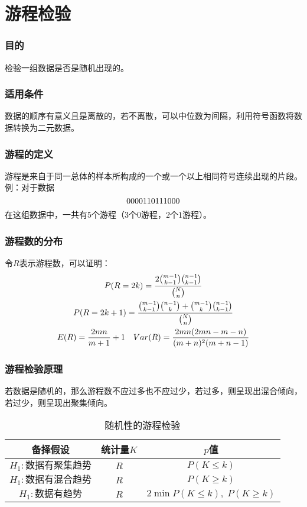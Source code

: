 \section{游程检验}

\subsubsection{目的}
检验一组数据是否是随机出现的。
\subsubsection{适用条件}
数据的顺序有意义且是离散的，若不离散，可以中位数为间隔，利用符号函数将数据转换为二元数据。
\subsubsection{游程的定义}
游程是来自于同一总体的样本所构成的一个或一个以上相同符号连续出现的片段。例：对于数据
\begin{equation}
	0 0 0 0 1 1 0 1 1 1 0 0 0 \notag
\end{equation}
\hspace{2em}在这组数据中，一共有$5$个游程（$3$个$0$游程，$2$个$1$游程）。
\subsubsection{游程数的分布}
令$R$表示游程数，可以证明：
\begin{gather}
	P(R=2k)=\frac{2\binom{m-1}{k-1}\binom{n-1}{k-1}}{\binom{N}{n}}\notag\\
	P(R=2k+1)=\frac{\binom{m-1}{k-1}\binom{n-1}{k}+\binom{m-1}{k}\binom{n-1}{k-1}}{\binom{N}{n}}\notag\\
	E(R) = \frac{2mn}{m+1}+1\quad Var(R)=\dfrac{2mn(2mn-m-n)}{(m+n)^2(m+n-1)}\notag
\end{gather}
\subsubsection{游程检验原理}
若数据是随机的，那么游程数不应过多也不应过少，若过多，则呈现出混合倾向，若过少，则呈现出聚集倾向。

\begin{table}[htbp]
	\centering
	\begin{tabular}{ccc}
		\toprule
		备择假设 & 统计量$K$ & $p$值 \\
		\midrule 
		$H_1:\text{数据有聚集趋势}$ & $R$ & $P(K\leqslant k)$ \\
		$H_1:\text{数据有混合趋势}$ & $R$ & $P(K\geqslant k)$ \\
		$H_1:\text{数据有趋势}$ & $R$ & $2\min{P(K\leqslant k),\;P(K\geqslant k)}$ \\
		\bottomrule 
	\end{tabular}
	\caption{随机性的游程检验}
\end{table}
